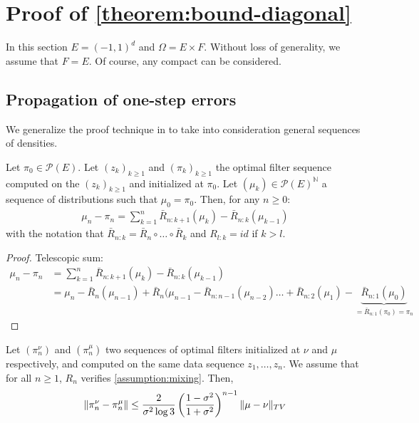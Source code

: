 \section{Proof of \cref{theorem:bound-diagonal}}\label{sec:proof-bound}
In this section $E = (-1, 1)^d$ and $\Omega = E \times F$. Without loss of generality, we assume that $F=E$. Of course, any compact can be considered.

\subsection{Propagation of one-step errors}

We generalize the proof technique in \cite{oudjane} to take into consideration general sequences of densities.

\begin{proposition}
Let $\pi_0\in\mathcal P(E)$. Let $(z_k)_{k\geq 1}$ and $(\pi_k)_{k\geq 1}$ the optimal filter sequence computed on the $(z_k)_{k\geq 1}$ and initialized at $\pi_0$. Let $(\mu_k)\in\mathcal P(E)^\mathbb N$ a sequence of distributions such that $\mu_0 = \pi_0$. Then, for any $n\geq 0$:
\begin{align}\label{eq:telescopic}
    \mu_n - \pi_n = \sum_{k=1}^n \bar R_{n:k+1}(\mu_k) - \bar R_{n:k}(\mu_{k-1})
\end{align}
with the notation that $\bar R_{n:k} = \bar R_n \circ \dots \circ \bar R_k$ and $R_{l:k}=id$ if $k > l$.
\end{proposition}
\begin{proof}
    Telescopic sum:
\begin{align}
    \mu_n - \pi_n &= \sum_{k=1}^n \bar R_{n:k+1}(\mu_k) - \bar R_{n:k}(\mu_{k-1})\\
    &= \mu_n - \bar R_n(\mu_{n-1}) + \bar R_{n}(\mu_{n-1} - \bar R_{n:n-1}(\mu_{n-2}) \ldots + \bar R_{n:2}(\mu_1) - \underbrace{\bar R_{n:1}(\mu_0)}_{=\bar R_{n:1}(\pi_0)=\pi_n}
\end{align}
\end{proof}



\begin{proposition}\label{prop:optimal-forgetting}
Let $(\pi_n^\nu)$ and $(\pi_n^\mu)$ two sequences of optimal filters initialized at $\nu$ and $\mu$ respectively, and computed on the same data sequence $z_1, \ldots, z_n$. We assume that for all $n\geq 1$, $R_n$ verifies \cref{assumption:mixing}. Then,
\begin{align}
    \Vert \pi^\nu_n - \pi^\mu_n \Vert \leq \frac{2}{\sigma^2\log 3}\left(\frac{1 - \sigma^2}{1 + \sigma^2}\right)^{n-1}\Vert \mu - \nu \Vert_{TV}
\end{align}
\end{proposition}

